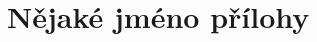 \documentclass[a4paper, 12pt]{article}
\begin{document}
\listoftables

\newpage
{}




\newpage

\appendix

\section{Nějaké jméno přílohy}
\label{PrilohaA}
\end{document}
